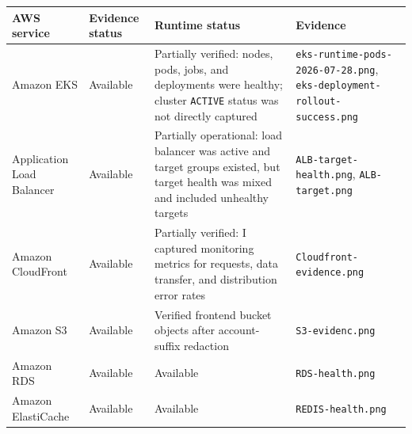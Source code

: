 {
\begingroup
\small
\setlength{\tabcolsep}{3pt}
\renewcommand{\arraystretch}{1.15}
\begin{longtable}{@{}
  >{\raggedright\arraybackslash}p{}
  >{\raggedright\arraybackslash}p{}
  >{\raggedright\arraybackslash}p{}
  >{\raggedright\arraybackslash}p{}@{}}
\toprule\noalign{}
\begin{minipage}[b]{\linewidth}\raggedright
AWS service
\end{minipage} & \begin{minipage}[b]{\linewidth}\raggedright
Evidence status
\end{minipage} & \begin{minipage}[b]{\linewidth}\raggedright
Runtime status
\end{minipage} & \begin{minipage}[b]{\linewidth}\raggedright
Evidence
\end{minipage} \\
\midrule\noalign{}
\endhead
\bottomrule\noalign{}
\endlastfoot
Amazon EKS & Available & Partially verified: nodes, pods, jobs, and
deployments were healthy; cluster \texttt{ACTIVE} status was not
directly captured & \texttt{eks-\allowbreak{}runtime-\allowbreak{}pods-\allowbreak{}2026-\allowbreak{}07-\allowbreak{}28.\allowbreak{}png},
\texttt{eks-\allowbreak{}deployment-\allowbreak{}rollout-\allowbreak{}success.\allowbreak{}png} \\
Application Load Balancer & Available & Partially operational: load
balancer was active and target groups existed, but target health was
mixed and included unhealthy targets & \texttt{ALB-\allowbreak{}target-\allowbreak{}health.\allowbreak{}png},
\texttt{ALB-\allowbreak{}target.\allowbreak{}png} \\
Amazon CloudFront & Available & Partially verified: I captured
monitoring metrics for requests, data transfer, and distribution error
rates & \texttt{Cloudfront-\allowbreak{}evidence.\allowbreak{}png} \\
Amazon S3 & Available & Verified frontend bucket objects after
account-suffix redaction & \texttt{S3-\allowbreak{}evidenc.\allowbreak{}png} \\
Amazon RDS & Available & Available & \texttt{RDS-\allowbreak{}health.\allowbreak{}png} \\
Amazon ElastiCache & Available & Available &
\texttt{REDIS-\allowbreak{}health.\allowbreak{}png} \\

\end{longtable}}
